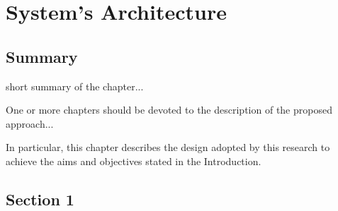 
\chapter{System's Architecture}
\label{chap:second}
\ifpdf
    \graphicspath{{Chapter2/Figures/PNG/}{Chapter2/Figures/PDF/}{Chapter1/Figures/}}
\else
    \graphicspath{{Chapter2/Figures/EPS/}{Chapter2/Figures/}}
\fi

\section*{Summary}
short summary of the chapter...

One or more chapters should be devoted to the description of the
proposed approach...

In particular, this chapter describes the design adopted by this research to achieve the aims and objectives stated in the Introduction.

\section{Section 1}
